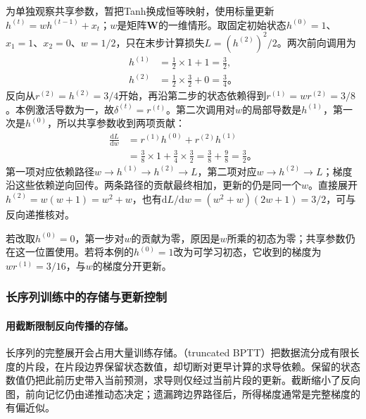\begin{example}[两步递推中的梯度累积]
  \label{ex:rnn-shared-gradient}
  为单独观察共享参数，暂把Tanh换成恒等映射，使用标量更新$h^{(t)}=w h^{(t-1)}+x_t$；$w$是矩阵$\bm W$的一维情形。取固定初始状态$h^{(0)}=1$、$x_1=1$、$x_2=0$、$w=1/2$，只在末步计算损失$L=(h^{(2)})^2/2$。两次前向调用为
  \[
    \begin{aligned}
      h^{(1)}&=\tfrac12\times1+1=\tfrac32,\\
      h^{(2)}&=\tfrac12\times\tfrac32+0=\tfrac34\text{。}
    \end{aligned}
  \]
  反向从$r^{(2)}=h^{(2)}=3/4$开始，再沿第二步的状态依赖得到$r^{(1)}=w r^{(2)}=3/8$。本例激活导数为一，故$\delta^{(t)}=r^{(t)}$。第二次调用对$w$的局部导数是$h^{(1)}$，第一次是$h^{(0)}$，所以共享参数收到两项贡献：
  \[
    \begin{aligned}
      \frac{\mathrm dL}{\mathrm dw}
        &=r^{(1)}h^{(0)}+r^{(2)}h^{(1)}\\
        &=\tfrac38\times1+\tfrac34\times\tfrac32
          =\tfrac38+\tfrac98=\tfrac32\text{。}
    \end{aligned}
  \]
  第一项对应依赖路径$w\to h^{(1)}\to h^{(2)}\to L$，第二项对应$w\to h^{(2)}\to L$；梯度沿这些依赖逆向回传。两条路径的贡献最终相加，更新的仍是同一个$w$。直接展开$h^{(2)}=w(w+1)=w^2+w$，也有$\mathrm dL/\mathrm dw=(w^2+w)(2w+1)=3/2$，可与反向递推核对。

  若改取$h^{(0)}=0$，第一步对$w$的贡献为零，原因是$w$所乘的初态为零；共享参数仍在这一位置使用。若将本例的$h^{(0)}=1$改为可学习初态，它收到的梯度为$w r^{(1)}=3/16$，与$w$的梯度分开更新。
\end{example}

\subsubsection{长序列训练中的存储与更新控制}
\label{sec:rnn-truncation}

\paragraph{用截断限制反向传播的存储。}

长序列的完整展开会占用大量训练存储。（truncated BPTT）把数据流分成有限长度的片段，在片段边界保留状态数值，却切断对更早计算的求导依赖。保留的状态数值仍把此前历史带入当前预测，求导则仅经过当前片段的更新。截断缩小了反向图，前向记忆仍由递推动态决定；遗漏跨边界路径后，所得梯度通常是完整梯度的有偏近似。

